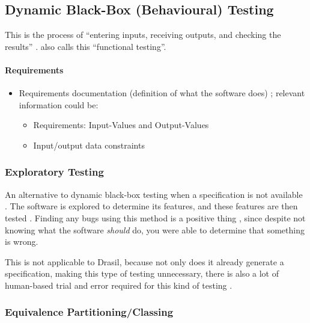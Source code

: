 \subsection{Dynamic Black-Box (Behavioural) Testing
      \citep[pp.~64-65]{Patton2006}}

This is the process of ``entering inputs, receiving outputs, and checking the
results'' \citep[p.~64]{Patton2006}. \citep[p.~399]{vanVliet2000}
also calls this ``functional testing''.

\paragraph{Requirements}
\begin{itemize}
      \item Requirements documentation (definition of what the software does)
            \citep[p.~64]{Patton2006}; relevant information could be:
            \begin{itemize}
                  \item Requirements: Input-Values and Output-Values
                  \item Input/output data constraints
            \end{itemize}
\end{itemize}

\subsubsection{Exploratory Testing \citep[p.~65]{Patton2006}}

An alternative to dynamic black-box testing when a specification is not
available \citep[p.~65]{Patton2006}. The software is explored to
determine its features, and these features are then tested
\citep[p.~65]{Patton2006}. Finding any bugs using this method is a
positive thing \citep[p.~65]{Patton2006}, since despite not knowing
what the software \emph{should} do, you were able to determine that something
is wrong.

This is not applicable to Drasil, because not only does it already generate a
specification, making this type of testing unnecessary, there is also a lot of
human-based trial and error required for this kind of testing
\citep{june_11_meeting}.

\subsubsection{Equivalence Partitioning/Classing \citep[pp.~67-69]{Patton2006}}

